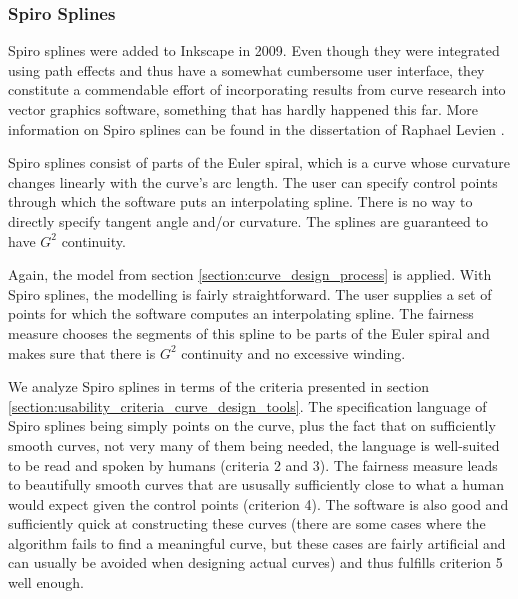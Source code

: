 \documentclass[a4paper]{article}
\begin{document}
			\subsubsection{Spiro Splines}
			\label{section:spiro_splines}

				Spiro splines were added to Inkscape in 2009. Even though they were integrated using path effects and thus have a somewhat cumbersome user interface, they constitute a commendable effort of incorporating results from curve research into vector graphics software, something that has hardly happened this far. More information on Spiro splines can be found in the dissertation of Raphael Levien \cite{Levien2009}.

				Spiro splines consist of parts of the Euler spiral, which is a curve whose curvature changes linearly with the curve's arc length. The user can specify control points through which the software puts an interpolating spline. There is no way to directly specify tangent angle and/or curvature. The splines are guaranteed to have \(G^2\) continuity.

				Again, the model from section \ref{section:curve_design_process} is applied. With Spiro splines, the modelling is fairly straightforward. The user supplies a set of points for which the software computes an interpolating spline. The fairness measure chooses the segments of this spline to be parts of the Euler spiral and makes sure that there is \(G^2\) continuity and no excessive winding.

				We analyze Spiro splines in terms of the criteria presented in section \ref{section:usability_criteria_curve_design_tools}. The specification language of Spiro splines being simply points on the curve, plus the fact that on sufficiently smooth curves, not very many of them being needed, the language is well-suited to be read and spoken by humans (criteria 2 and 3). The fairness measure leads to beautifully smooth curves that are ususally sufficiently close to what a human would expect given the control points (criterion 4). The software is also good and sufficiently quick at constructing these curves (there are some cases where the algorithm fails to find a meaningful curve, but these cases are fairly artificial and can usually be avoided when designing actual curves) and thus fulfills criterion 5 well enough.
\end{document}
